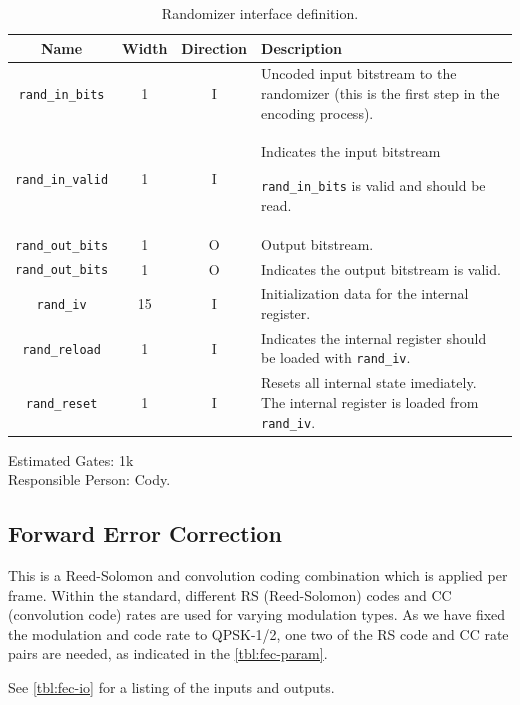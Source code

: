 \documentclass[dvips,10pt,twocolumn]{article}
\begin{document}
	\begin{table} \begin{tabularx}{\textwidth}{c|c|c|X}
		\label{tbl:rand-io}
		Name & Width & Direction & Description \\ \hline

		\texttt{rand\_in\_bits}  & 1  & I & Uncoded input bitstream to the
		randomizer (this is the first step in the encoding process).\\

		\texttt{rand\_in\_valid} & 1  & I & Indicates the input bitstream

		\texttt{rand\_in\_bits} is valid and should be read. \\

		\texttt{rand\_out\_bits} & 1  & O & Output bitstream. \\
		
		\texttt{rand\_out\_bits} & 1  & O & Indicates the output bitstream
		is valid. \\

		\texttt{rand\_iv}        & 15 & I & Initialization data for the
		internal register. \\

		\texttt{rand\_reload}    & 1  & I & Indicates the internal
		register should be loaded with \texttt{rand\_iv}. \\

		\texttt{rand\_reset}     & 1  & I & Resets all internal state
		imediately. The internal register is loaded from
		\texttt{rand\_iv}.

	\end{tabularx}
	\caption{Randomizer interface definition.}
	\end{table}

	Estimated Gates: 1k \\
	Responsible Person: Cody.

	\subsection{Forward Error Correction}
	\label{sec:fec}
	This is a Reed-Solomon and convolution coding combination
	which is applied per frame. Within the standard, different
	RS (Reed-Solomon) codes and CC (convolution code) rates are
	used for varying modulation types. As we have fixed the
	modulation and code rate to QPSK-1/2, one two of the RS
	code and CC rate pairs are needed, as indicated in the
	\autoref{tbl:fec-param}.

	See \autoref{tbl:fec-io} for a listing of the inputs and outputs.
	
\end{document}
